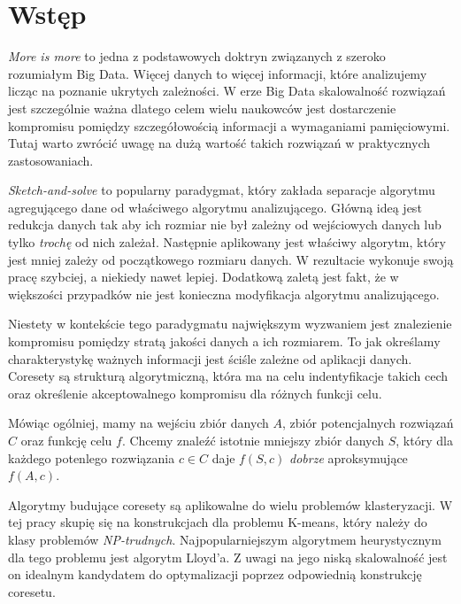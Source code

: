 \chapter{Wstęp}
\textit{More is more} to jedna z podstawowych doktryn związanych z szeroko rozumiałym Big Data.
Więcej danych to więcej informacji, które analizujemy licząc na poznanie ukrytych zależności.
W erze Big Data skalowalność rozwiązań jest szczególnie ważna dlatego celem wielu naukowców jest dostarczenie kompromisu pomiędzy szczegółowością informacji a wymaganiami pamięciowymi.
Tutaj warto zwrócić uwagę na dużą wartość takich rozwiązań w praktycznych zastosowaniach.

\textit{Sketch-and-solve} to popularny paradygmat, który zakłada separacje algorytmu agregującego dane od właściwego algorytmu analizującego.
Główną ideą jest redukcja danych tak aby ich rozmiar nie był zależny od wejściowych danych lub tylko \textit{trochę} od nich zależał.
Następnie aplikowany jest właściwy algorytm, który jest mniej zależy od początkowego rozmiaru danych.
W rezultacie wykonuje swoją pracę szybciej, a niekiedy nawet lepiej.
Dodatkową zaletą jest fakt, że w większości przypadków nie jest konieczna modyfikacja algorytmu analizującego.

Niestety w kontekście tego paradygmatu największym wyzwaniem jest znalezienie kompromisu pomiędzy stratą jakości danych a ich rozmiarem.
To jak określamy charakterystykę ważnych informacji jest ściśle zależne od aplikacji danych.
Coresety są strukturą algorytmiczną, która ma na celu indentyfikacje takich cech oraz określenie akceptowalnego kompromisu dla różnych funkcji celu.

Mówiąc ogólniej, mamy na wejściu zbiór danych $A$, zbiór potencjalnych rozwiązań $C$ oraz funkcję celu $f$.
Chcemy znaleźć istotnie mniejszy zbiór danych $S$, który dla każdego potenlego rozwiązania $c \in C$ daje $f(S, c)$ \textit{dobrze} aproksymujące $f(A,c)$.

Algorytmy budujące coresety są aplikowalne do wielu problemów klasteryzacji.
W tej pracy skupię się na konstrukcjach dla problemu K-means, który należy do klasy problemów \textit{NP-trudnych}.
Najpopularniejszym algorytmem heurystycznym dla tego problemu jest algorytm Lloyd'a.
Z uwagi na jego niską skalowalność jest on idealnym kandydatem do optymalizacji poprzez odpowiednią konstrukcję coresetu.
